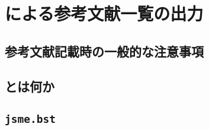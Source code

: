 \chapter{\BibTeX による参考文献一覧の出力}
\label{ch:biblist}


\section{参考文献記載時の一般的な注意事項}
\label{sec:bibcaution}


\section{\BibTeX とは何か}
\label{sec:bibtex}


\section{\texttt{jsme.bst}}
\label{sec:jsme-bst}


